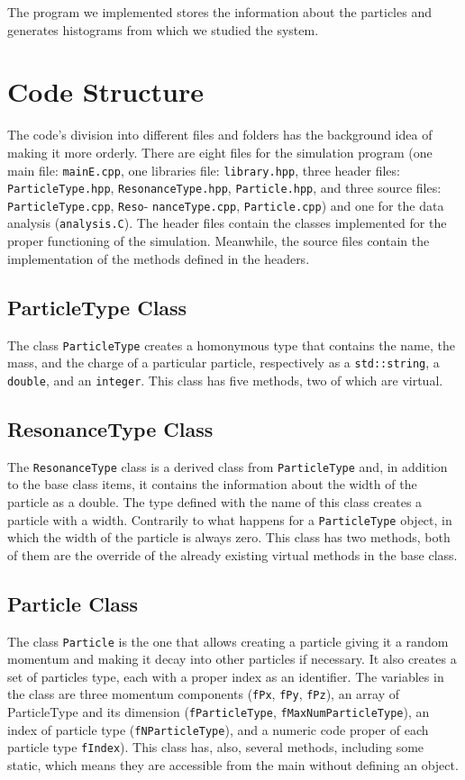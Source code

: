 \documentclass[a4paper, 11pt]{article}
\begin{document}
    The program we implemented stores the information about the particles and generates histograms from which we studied the system.
    \section{Code Structure}
      The code's division into different files and folders has the background idea of making it more orderly. There are eight files for the simulation program (one main file: \verb|mainE.cpp|, one libraries file: \verb|library.hpp|, three header files: \verb|ParticleType.hpp|, \verb|ResonanceType.hpp|, \verb|Particle.hpp|, and three source files: \verb|ParticleType.cpp|, \verb|Reso|- \verb|nanceType.cpp|, \verb|Particle.cpp|) and one for the data analysis (\verb|analysis.C|).
      The header files contain the classes implemented for the proper functioning of the simulation. Meanwhile, the source files contain the implementation of the methods defined in the headers.
      \subsection*{ParticleType Class}
      The class \verb|ParticleType| creates a homonymous type that contains the name, the mass, and the charge of a particular particle, respectively as a \verb|std::string|, a \verb|double|, and an \verb|integer|. This class has five methods, two of which are virtual.
      \subsection* {ResonanceType Class}
      The \verb|ResonanceType| class is a derived class from \verb|ParticleType| and, in addition to the base class items, it contains the information about the width of the particle as a double. The type defined with the name of this class creates a particle with a width. Contrarily to what happens for a \verb|ParticleType| object, in which the width of the particle is always zero. This class has two methods, both of them are the override of the already existing virtual methods in the base class.
      \subsection* {Particle Class}
      The class \verb|Particle| is the one that allows creating a particle giving it a random momentum and making it decay into other particles if necessary. It also creates a set of particles type, each with a proper index as an identifier. The variables in the class are three momentum components (\verb|fPx|, \verb|fPy|, \verb|fPz|), an array of ParticleType and its dimension (\verb|fParticleType|, \verb|fMaxNumParticleType|), an index of particle type (\verb|fNParticleType|), and a numeric code proper of each particle type \verb|fIndex|). This class has, also, several methods, including some static, which means they are accessible from the main without defining an object.
\end{document}
